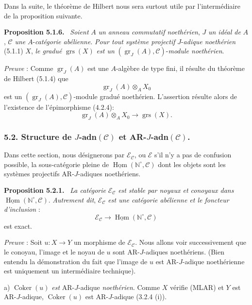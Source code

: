 \documentclass[11pt]{article}
\newenvironment{statement}[1]{\par\medskip\noindent\textbf{#1.}\ }{\par\medskip}
\DeclareMathOperator{\Hom}{Hom}
\providecommand{\Coker}{\operatorname{Coker}}
\providecommand{\uHom}{\underline{\Hom}}
\providecommand{\gr}{\operatorname{gr}}
\providecommand{\Hom}{\operatorname{Hom}}
\providecommand{\Coker}{\operatorname{Coker}}
\providecommand{\gr}{\operatorname{gr}}
\providecommand{\gr}{\operatorname{gr}}
\providecommand{\grs}{\operatorname{grs}}
\providecommand{\Coker}{\operatorname{Coker}}
\providecommand{\Hom}{\operatorname{Hom}}
\begin{document}
Dans la suite, le théorème de Hilbert nous sera surtout utile par l'intermédiaire de la proposition suivante.

\begin{statement}{Proposition 5.1.6}
\emph{Soient} \(A\) \emph{un anneau commutatif noethérien}, \(J\) \emph{un idéal de} \(A\), \(\mathcal C\) \emph{une} \(A\)-\emph{catégorie abélienne}. \emph{Pour tout système projectif} \(J\)-\emph{adique noethérien} (5.1.1) \(X\), \emph{le gradué} \(\grs(X)\) \emph{est un} \((\gr_J(A),\mathcal C)\)-\emph{module noethérien}.
\end{statement}

\emph{Preuve} : Comme \(\gr_J(A)\) est une \(A\)-algèbre de type fini, il résulte du théorème de Hilbert (5.1.4) que
\[
\gr_J(A)\otimes_A X_0
\]
est un \((\gr_J(A),\mathcal C)\)-module gradué noethérien. L'assertion résulte alors de l'existence de l'épimorphisme (4.2.4):
\[
\gr_J(A)\otimes_A X_0\longrightarrow \grs(X).
\]

\subsubsection*{5.2. Structure de \(J\)-adn\((\mathcal C)\) et AR-\(J\)-adn\((\mathcal C)\).}

Dans cette section, nous désignerons par \(\mathcal E_{\mathcal C}\), ou \(\mathcal E\) s'il n'y a pas de confusion possible, la sous-catégorie pleine de \(\uHom(\mathbb N^\circ,\mathcal C)\) dont les objets sont les systèmes projectifs AR-\(J\)-adiques noethériens.

\begin{statement}{Proposition 5.2.1}
\emph{La catégorie} \(\mathcal E_{\mathcal C}\) \emph{est stable par noyaux et conoyaux dans} \(\uHom(\mathbb N^\circ,\mathcal C)\). \emph{Autrement dit}, \(\mathcal E_{\mathcal C}\) \emph{est une catégorie abélienne et le foncteur} \emph{d'inclusion} :
\[
\mathcal E_{\mathcal C}\longrightarrow \uHom(\mathbb N^\circ,\mathcal C)
\]
est exact.
\end{statement}

\emph{Preuve} :
Soit \(u:X\to Y\) un morphisme de \(\mathcal E_{\mathcal C}\). Nous allons voir successivement que le conoyau, l'image et le noyau de \(u\) sont AR-\(J\)-adiques noethériens. (Bien entendu la démonstration du fait que l'image de \(u\) est AR-\(J\)-adique noethérienne est uniquement un intermédiaire technique).

a) \(\Coker(u)\) \emph{est} AR-\(J\)-adique \emph{noethérien}. Comme \(X\) vérifie (MLAR) et \(Y\) est AR-\(J\)-adique, \(\Coker(u)\) est AR-\(J\)-adique (3.2.4 (i)).
\end{document}
